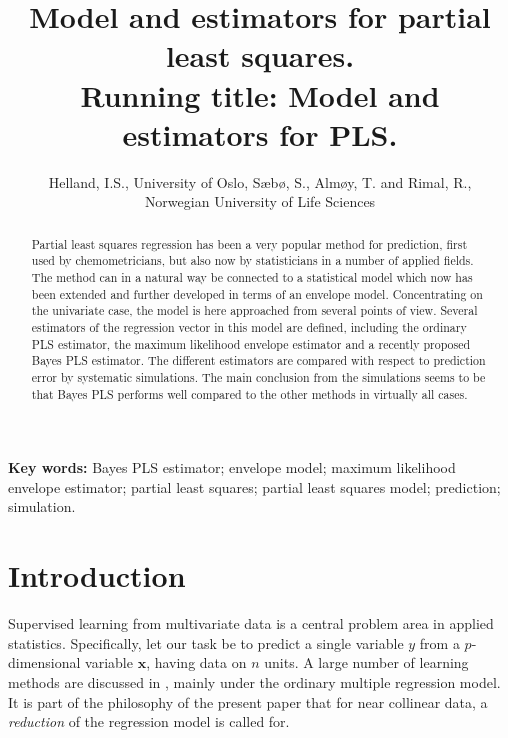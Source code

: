 \documentclass[a4paper, 11pt]{article}
\begin{document}
\title{Model and estimators for partial least squares.\\
  Running title: Model and estimators for PLS.}

\author{Helland, I.S., University of Oslo,  S\ae b\o , S., Alm\o y, T.  and Rimal, R.,\\
  Norwegian University of Life Sciences}

\maketitle

\begin{abstract}

Partial least squares regression has been a very popular method for prediction, first used by chemometricians, but also now by statisticians in a number of applied fields. The method can in a natural way be connected to a statistical model which now has been extended and further developed in terms of an envelope model. Concentrating on the univariate case, the model is here approached from several points of view. Several estimators of the regression vector in this model are defined, including the ordinary PLS estimator, the maximum likelihood envelope estimator and a recently proposed Bayes PLS estimator. The different estimators are compared with respect to prediction error by systematic simulations. The main conclusion from the simulations seems to be that Bayes PLS performs well compared to the other methods in virtually all cases.

\end{abstract}

\textbf{Key words:} Bayes PLS estimator; envelope model; maximum likelihood envelope estimator; partial least squares; partial least squares model; prediction; simulation.


\section{Introduction}

Supervised learning from multivariate data is a central problem area in applied statistics. Specifically, let our task be to predict a single variable $y$ from a $p$-dimensional variable $\bm{x}$, having data on $n$ units. A large number of learning methods are discussed in \citet{hastie2009elements}, mainly under the ordinary multiple regression model. It is part of the philosophy of the present paper that for near collinear data, a \emph{reduction} of the regression model is called for.
\end{document}
